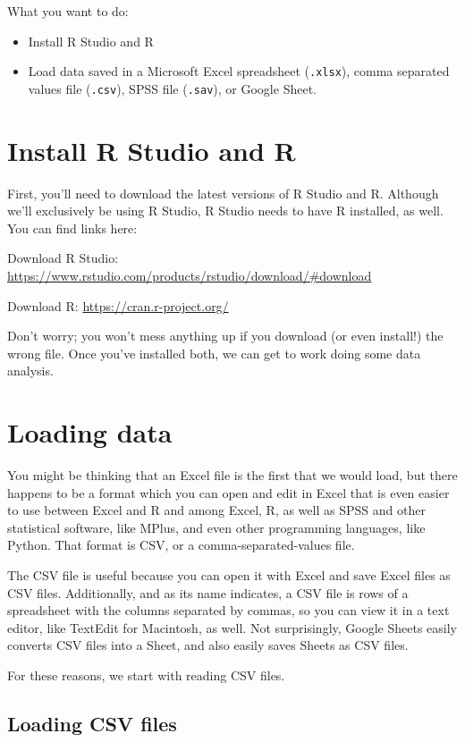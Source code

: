 \documentclass[]{book}
\theoremstyle{definition}
\theoremstyle{definition}
\theoremstyle{remark}
\begin{document}
What you want to do:

\begin{itemize}
\item
  Install R Studio and R
\item
  Load data saved in a Microsoft Excel spreadsheet (\texttt{.xlsx}),
  comma separated values file (\texttt{.csv}), SPSS file
  (\texttt{.sav}), or Google Sheet.
\end{itemize}

\section{Install R Studio and R}\label{install-r-studio-and-r}

First, you'll need to download the latest versions of R Studio and R.
Although we'll exclusively be using R Studio, R Studio needs to have R
installed, as well. You can find links here:

Download R Studio:
\url{https://www.rstudio.com/products/rstudio/download/\#download}

Download R: \url{https://cran.r-project.org/}

Don't worry; you won't mess anything up if you download (or even
install!) the wrong file. Once you've installed both, we can get to work
doing some data analysis.

\section{Loading data}\label{loading-data}

You might be thinking that an Excel file is the first that we would
load, but there happens to be a format which you can open and edit in
Excel that is even easier to use between Excel and R and among Excel, R,
as well as SPSS and other statistical software, like MPlus, and even
other programming languages, like Python. That format is CSV, or a
comma-separated-values file.

The CSV file is useful because you can open it with Excel and save Excel
files as CSV files. Additionally, and as its name indicates, a CSV file
is rows of a spreadsheet with the columns separated by commas, so you
can view it in a text editor, like TextEdit for Macintosh, as well. Not
surprisingly, Google Sheets easily converts CSV files into a Sheet, and
also easily saves Sheets as CSV files.

For these reasons, we start with reading CSV files.

\subsection{Loading CSV files}\label{loading-csv-files}
\end{document}
